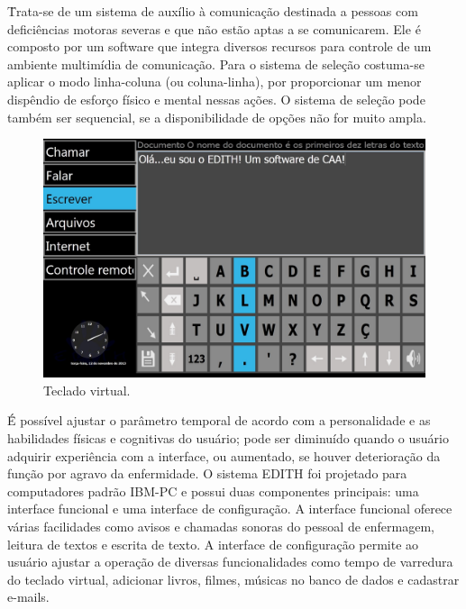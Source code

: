 \documentclass[twoside]{article}
\begin{document}
\begin{multicols}{2}
\=Trata-se de um sistema de auxílio à comunicação destinada a pessoas com deficiências motoras severas e que não estão aptas a se comunicarem. Ele é composto por um software que integra diversos recursos para controle de um ambiente multimídia de comunicação. Para o sistema de seleção costuma-se aplicar o modo linha-coluna (ou coluna-linha), por proporcionar um menor dispêndio de esforço físico e mental nessas ações. O sistema de seleção pode também ser sequencial, se a disponibilidade de opções não for muito ampla. 

\begin{figure}[H]
\label{fig:edith_tecladovirtual}
  \caption{Teclado virtual.}
  \centering
    \includegraphics[scale = 0.18]{edith_tecladovirtual.png}
\end{figure}

\=É possível ajustar o parâmetro temporal de acordo com a personalidade e as habilidades físicas e cognitivas do usuário; pode ser diminuído quando o usuário adquirir experiência com a interface, ou aumentado, se houver deterioração da função por agravo da enfermidade. O sistema EDITH foi projetado para computadores padrão IBM-PC e possui duas componentes principais: uma interface funcional e uma interface de configuração. A interface funcional oferece várias facilidades como avisos e chamadas sonoras do pessoal de enfermagem, leitura de textos e escrita de texto. A interface de configuração permite ao usuário ajustar a operação de diversas funcionalidades como tempo de varredura do teclado virtual, adicionar livros, filmes, músicas no banco de dados e cadastrar e-mails.


\end{multicols}
\end{document}
